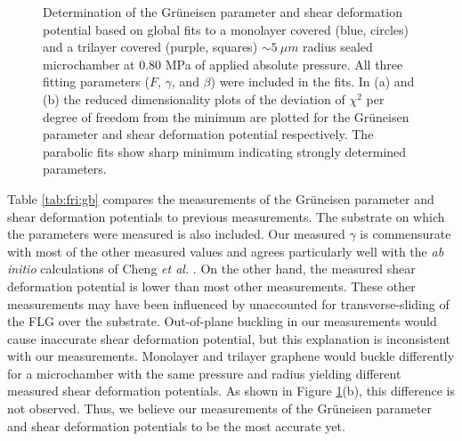 \begin{figure}
	\begin{center}
	
	\end{center}
	\caption[Determination of the Gr\"{u}neisen parameter and shear deformation potential]{\label{fig:fri:gammabeta}Determination of the Gr\"{u}neisen parameter and shear deformation potential based on global fits to a monolayer covered (blue, circles) and a trilayer covered (purple, squares) $\sim 5 \ \mu m$ radius sealed microchamber at 0.80 MPa of applied absolute pressure.
	All three fitting parameters ($F$, $\gamma$, and $\beta$) were included in the fits.
	In (a) and (b) the reduced dimensionality plots of the deviation of $\chi^2$ per degree of freedom from the minimum are plotted for the Gr\"{u}neisen parameter and shear deformation potential respectively.
	The parabolic fits show sharp minimum indicating strongly determined parameters.
	}
\end{figure}

Table \ref{tab:fri:gb} compares the measurements of the Gr\"{u}neisen parameter and shear deformation potentials to previous measurements.
The substrate on which the parameters were measured is also included.
Our measured $\gamma$ is commensurate with most of the other measured values and agrees particularly well with the \textit{ab initio} calculations of Cheng \textit{et al.} \cite{Cheng2011}.
On the other hand, the measured shear deformation potential is lower than most other measurements.
These other measurements may have been influenced by unaccounted for transverse-sliding of the FLG over the substrate.
Out-of-plane buckling in our measurements would cause inaccurate shear deformation potential, but this explanation is inconsistent with our measurements.
Monolayer and trilayer graphene would buckle differently for a microchamber with the same pressure and radius yielding different measured shear deformation potentials.
As shown in Figure \ref{fig:fri:gammabeta}(b), this difference is not observed.
Thus, we believe our measurements of the Gr\"{u}neisen parameter and shear deformation potentials to be the most accurate yet.

